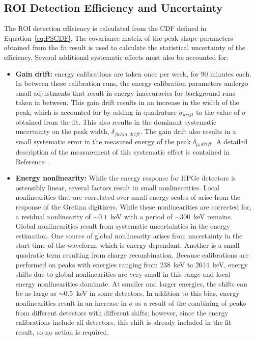 \documentclass[/main.tex]{subfiles}
\begin{document}
\subsection{ROI Detection Efficiency and Uncertainty} \label{sec:ROIEff}
The ROI detection efficiency is calculated from the CDF defined in Equation~\ref{eq:PSCDF}.
The covariance matrix of the peak shape parameters obtained from the fit result is used to calculate the statistical uncertainty of the efficiency.
Several additional systematic effects must also be accounted for:
\begin{itemize}
\item \textbf{Gain drift:}  energy calibrations are taken once per week, for 90 minutes each.
  In between these calibration runs, the energy calibration parameters undergo small adjustments that result in energy inaccuracies for background runs taken in between.
  This gain drift results in an increase in the width of the peak, which is accounted for by adding in quadrature $\sigma_{drift}$ to the value of $\sigma$ obtained from the fit.
  This also results in the dominant systematic uncertainty on the peak width, $\delta_{fwhm,drift}$.
  The gain drift also results in a small systematic error in the measured energy of the peak $\delta_{\mu,drift}$.
  A detailed description of the measurement of this systematic effect is contained in Reference~\cite{energysystunidoc}.  
\item \textbf{Energy nonlinearity:} While the energy response for HPGe detectors is ostensibly linear, several factors result in small nonlinearities.
  Local nonlinearities that are correlated over small energy scales of arise from the response of the Gretina digitizers.
  While these nonlinearities are corrected for, a residual nonlinearity of ${\sim}0.1$~keV with a period of ${\sim}300$~keV remains.
  Global nonlinearities result from systematic uncertainties in the energy estimation.
  One source of global nonlinearity arises from uncertainty in the start time of the waveform, which is energy dependant.
  Another is a small quadratic term resulting from charge recombination.
  Because calibrations are performed on peaks with energies ranging from 238~keV to 2614~keV, energy shifts due to global nonlinearities are very small in this range and local energy nonlinearities dominate.
  At smaller and larger energies, the shifts can be as large as ${\sim}0.5$~keV in some detectors.
  In addition to this bias, energy nonlinearities result in an increase in $\sigma$ as a result of the combining of peaks from different detectors with different shifts; however, since the energy calibrations include all detectors, this shift is already included in the fit result, so no action is required.

\end{itemize}
\end{document}
